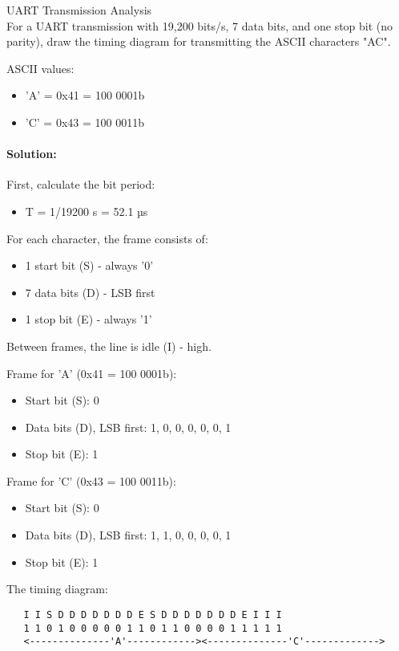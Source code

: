 \begin{example2}{UART Transmission Analysis}\\
For a UART transmission with 19,200 bits/s, 7 data bits, and one stop bit (no parity), draw the timing diagram for transmitting the ASCII characters "AC".

ASCII values:
\begin{itemize}
    \item 'A' = 0x41 = 100 0001b
    \item 'C' = 0x43 = 100 0011b
\end{itemize}

\tcblower
\paragraph{Solution:}
First, calculate the bit period:
\begin{itemize}
    \item T = 1/19200 s = 52.1 µs
\end{itemize}

For each character, the frame consists of:
\begin{itemize}
    \item 1 start bit (S) - always '0'
    \item 7 data bits (D) - LSB first
    \item 1 stop bit (E) - always '1'
\end{itemize}

Between frames, the line is idle (I) - high.

Frame for 'A' (0x41 = 100 0001b):
\begin{itemize}
    \item Start bit (S): 0
    \item Data bits (D), LSB first: 1, 0, 0, 0, 0, 0, 1
    \item Stop bit (E): 1
\end{itemize}

Frame for 'C' (0x43 = 100 0011b):
\begin{itemize}
    \item Start bit (S): 0
    \item Data bits (D), LSB first: 1, 1, 0, 0, 0, 0, 1
    \item Stop bit (E): 1
\end{itemize}

The timing diagram:
\begin{verbatim}
   I I S D D D D D D D E S D D D D D D D E I I I
   1 1 0 1 0 0 0 0 0 1 1 0 1 1 0 0 0 0 1 1 1 1 1
   <--------------'A'------------><--------------'C'------------->
\end{verbatim}


\end{example2}
